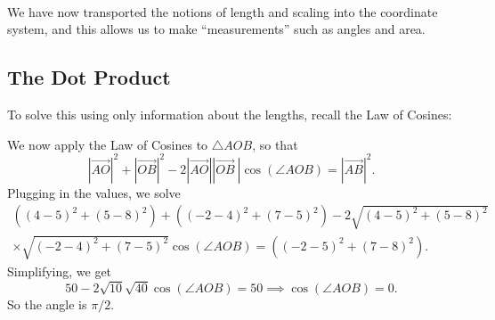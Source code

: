 \ \\
We have now transported the notions of length and scaling into the coordinate system, and this allows us to make ``measurements'' such as angles and area.

\subsection{The Dot Product}
To solve this using only information about the lengths, recall the Law of Cosines:


We now apply the Law of Cosines to $\triangle AOB$, so that\[
	|\overrightarrow{AO}|^2  +|\overrightarrow{OB}|^2- 2 |\overrightarrow{AO}| |\overrightarrow{OB} \ |\cos(\angle AOB) = |\overrightarrow{AB}|^2.
\]
Plugging in the values, we solve 
\begin{align*}
		((4-5)^2 + (5-8)^2) + ((-2-4)^2+(7-5)^2) - 2 \sqrt{(4-5)^2 + (5-8)^2} \\ \times \sqrt{(-2-4)^2+(7-5)^2} \cos(\angle AOB) = ((-2-5)^2+(7-8)^2).
\end{align*}
Simplifying, we get\[
	50 - 2 \sqrt{10} \sqrt{40} \cos(\angle AOB) = 50 \implies \cos(\angle AOB) = 0.
\]
So the angle is $\pi/2$.

